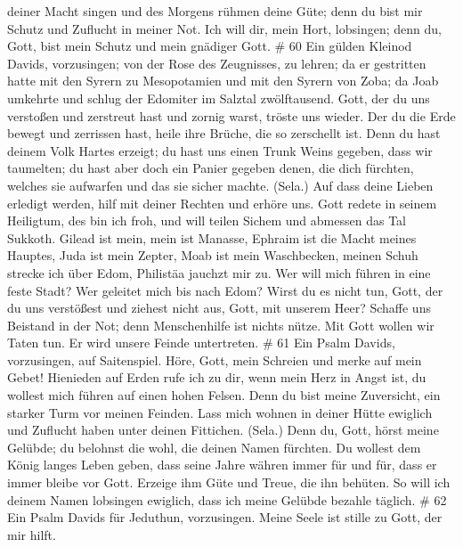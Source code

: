 deiner Macht singen und des Morgens rühmen deine Güte; denn du bist mir
Schutz und Zuflucht in meiner Not.  Ich will dir, mein
Hort, lobsingen; denn du, Gott, bist mein Schutz und mein gnädiger Gott.
\# 60  Ein gülden Kleinod Davids, vorzusingen; von der Rose
des Zeugnisses, zu lehren;  da er gestritten hatte mit den
Syrern zu Mesopotamien und mit den Syrern von Zoba; da Joab umkehrte und
schlug der Edomiter im Salztal zwölftausend.  Gott, der du
uns verstoßen und zerstreut hast und zornig warst, tröste uns wieder.
 Der du die Erde bewegt und zerrissen hast, heile ihre
Brüche, die so zerschellt ist.  Denn du hast deinem Volk
Hartes erzeigt; du hast uns einen Trunk Weins gegeben, dass wir
taumelten;  du hast aber doch ein Panier gegeben denen, die
dich fürchten, welches sie aufwarfen und das sie sicher machte. (Sela.)
 Auf dass deine Lieben erledigt werden, hilf mit deiner
Rechten und erhöre uns.  Gott redete in seinem Heiligtum,
des bin ich froh, und will teilen Sichem und abmessen das Tal Sukkoth.
 Gilead ist mein, mein ist Manasse, Ephraim ist die Macht
meines Hauptes, Juda ist mein Zepter,  Moab ist mein
Waschbecken, meinen Schuh strecke ich über Edom, Philistäa jauchzt mir
zu.  Wer will mich führen in eine feste Stadt? Wer geleitet
mich bis nach Edom?  Wirst du es nicht tun, Gott, der du
uns verstößest und ziehest nicht aus, Gott, mit unserem Heer?
 Schaffe uns Beistand in der Not; denn Menschenhilfe ist
nichts nütze.  Mit Gott wollen wir Taten tun. Er wird
unsere Feinde untertreten. \# 61  Ein Psalm Davids,
vorzusingen, auf Saitenspiel.  Höre, Gott, mein Schreien und
merke auf mein Gebet!  Hienieden auf Erden rufe ich zu dir,
wenn mein Herz in Angst ist, du wollest mich führen auf einen hohen
Felsen.  Denn du bist meine Zuversicht, ein starker Turm vor
meinen Feinden.  Lass mich wohnen in deiner Hütte ewiglich
und Zuflucht haben unter deinen Fittichen. (Sela.)  Denn du,
Gott, hörst meine Gelübde; du belohnst die wohl, die deinen Namen
fürchten.  Du wollest dem König langes Leben geben, dass
seine Jahre währen immer für und für,  dass er immer bleibe
vor Gott. Erzeige ihm Güte und Treue, die ihn behüten.  So
will ich deinem Namen lobsingen ewiglich, dass ich meine Gelübde bezahle
täglich. \# 62  Ein Psalm Davids für Jeduthun, vorzusingen.
 Meine Seele ist stille zu Gott, der mir hilft. 

